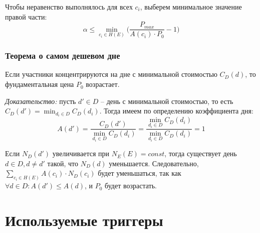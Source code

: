 Чтобы неравенство выполнялось для всех $c_i$, выберем минимальное значение правой части:
\begin{equation}
	\alpha \le \min_{c_i \in H(E)}{\Big(\frac{P_{max}}{A(c_i) \cdot P_0} - 1\Big)}
\end{equation}

\subsubsection{Теорема о самом дешевом дне}

Если участники концентрируются на дне с минимальной стоимостью $C_D(d)$, то фундаментальная цена $P_0$ возрастает.

\textit{Доказательство:} пусть $d' \in D$ -- день с минимальной стоимостью, то есть $C_D(d') = \min_{d_i \in D}{C_D(d_i)}$. Тогда имеем по определению коэффициента дня:
\begin{equation}
	A(d') = \frac{C_D(d')}{\min_{d_i \in D}{C_D(d_i)}} = \frac{\min_{d_i \in D}{C_D(d_i)}}{\min_{d_i \in D}{C_D(d_i)}} = 1
\end{equation}

Если $N_D(d')$ увеличивается при $N_E(E) = const$, тогда существует день \newline $d \in D, d \ne d'$ такой, что $N_D(d)$ уменьшается. Следовательно, \newline $\sum_{c_i \in H(E)}{A(c_i) \cdot N_D(c_i)}$ будет уменьшаться, так как $\forall d \in D: A(d') \le A(d)$, и $P_0$ будет возрастать.

\section{Используемые триггеры}

